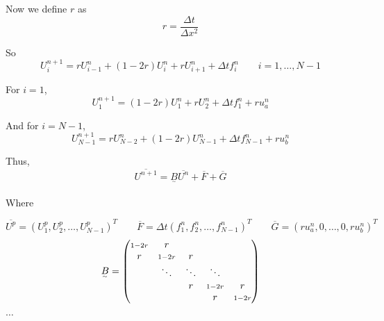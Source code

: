 Now we define $r$ as $$r = \frac{\Delta t}{\Delta x^2}$$

So $$U_i^{n+1} = rU_{i-1}^n + (1-2r)U_i^n + rU_{i+1}^n + \Delta t f_i^n \qquad i = 1,\ldots,N-1$$

For $i=1$, $$U_1^{n+1} = (1-2r)U_1^n + rU_2^n + \Delta t f_1^n + ru_a^n$$

And for $i=N-1$, $$U_{N-1}^{n+1} = rU_{N-2}^n + (1-2r)U_{N-1}^n + \Delta t f_{N-1}^n + ru_b^n$$

Thus, $$\overline{U^{n+1}} = \underset{^\sim}{B}\overline{U^n} + \overline{F} + \overline{G}$$

Where 

$$\overline{U^p} = \left(U_1^p, U_2^p, \ldots , U_{N-1}^p \right)^T \qquad \overline{F}=\Delta t\left(f_1^n, f_2^n, \ldots,f_{N-1}^n \right)^T \qquad \overline{G} = \left(ru_a^n, 0, \ldots,0,ru_b^n \right)^T$$
$$
  \underset{^\sim}{B} = 
  \begin{pmatrix}
    \scriptstyle\small{1-2r} & r \\
    r    & \scriptstyle\small{1-2r} & r \\
         & \ddots & \ddots & \ddots \\
         &        & r & \scriptstyle\small{1-2r} & r \\
         &        &   & r    & \scriptstyle\small{1-2r}
  \end{pmatrix}
$$

\newpage

$\ldots$
